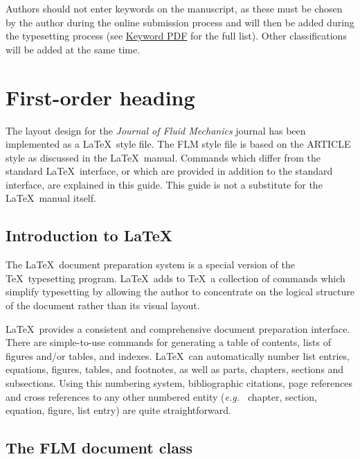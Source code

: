 \documentclass[lineno]{JFM-FLM_Au}
\begin{document}
\begin{keywords}
Authors should not enter keywords on the manuscript, as these must be chosen by the author during the online submission process and will then be added during the typesetting process (see \href{https://www.cambridge.org/core/journals/journal-of-fluid-mechanics/information/list-of-keywords}{Keyword PDF} for the full list).  Other classifications will be added at the same time.
\end{keywords}


\section{First-order heading}
\label{sec:headings}

The layout design for the {\em Journal of Fluid Mechanics} journal
has been implemented as a LaTeX\ style file.%
The FLM style file is based on the ARTICLE style as discussed in the LaTeX\ manual. Commands which
differ from the standard LaTeX\ interface, or which are provided in addition
to the standard interface, are explained in this guide. This guide is not a
substitute for the LaTeX\ manual itself.


\subsection{Introduction to LaTeX}

The LaTeX\ document preparation system is a special version of the
TeX\ typesetting program. LaTeX\ adds to TeX\ a collection of
commands which simplify typesetting by allowing the author to
concentrate on the logical structure of the document rather than
its visual layout.

LaTeX\ provides a consistent and comprehensive document preparation
interface. There are simple-to-use commands for generating a table of
contents, lists of figures and/or tables, and indexes. LaTeX\ can
automatically number list entries, equations, figures, tables, and
footnotes, as well as parts, chapters, sections and subsections.
Using this numbering system, bibliographic citations, page references
and cross references to any other numbered entity ({\it e.g.\ } chapter,
section, equation, figure, list entry) are quite straightforward.

\subsection{The FLM document class}
\end{document}

